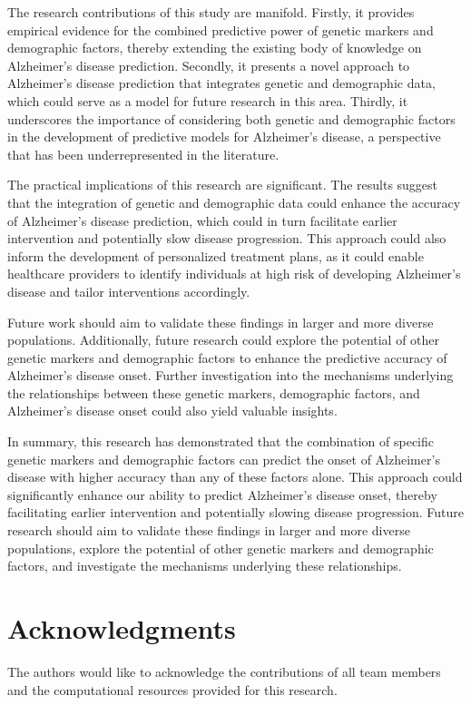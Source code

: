 \documentclass[conference]{IEEEtran}
\begin{document}
The research contributions of this study are manifold. Firstly, it provides empirical evidence for the combined predictive power of genetic markers and demographic factors, thereby extending the existing body of knowledge on Alzheimer's disease prediction. Secondly, it presents a novel approach to Alzheimer's disease prediction that integrates genetic and demographic data, which could serve as a model for future research in this area. Thirdly, it underscores the importance of considering both genetic and demographic factors in the development of predictive models for Alzheimer's disease, a perspective that has been underrepresented in the literature.

The practical implications of this research are significant. The results suggest that the integration of genetic and demographic data could enhance the accuracy of Alzheimer's disease prediction, which could in turn facilitate earlier intervention and potentially slow disease progression. This approach could also inform the development of personalized treatment plans, as it could enable healthcare providers to identify individuals at high risk of developing Alzheimer's disease and tailor interventions accordingly.

Future work should aim to validate these findings in larger and more diverse populations. Additionally, future research could explore the potential of other genetic markers and demographic factors to enhance the predictive accuracy of Alzheimer's disease onset. Further investigation into the mechanisms underlying the relationships between these genetic markers, demographic factors, and Alzheimer's disease onset could also yield valuable insights.

In summary, this research has demonstrated that the combination of specific genetic markers and demographic factors can predict the onset of Alzheimer's disease with higher accuracy than any of these factors alone. This approach could significantly enhance our ability to predict Alzheimer's disease onset, thereby facilitating earlier intervention and potentially slowing disease progression. Future research should aim to validate these findings in larger and more diverse populations, explore the potential of other genetic markers and demographic factors, and investigate the mechanisms underlying these relationships.

\section{Acknowledgments}
The authors would like to acknowledge the contributions of all team members and the computational resources provided for this research.
\end{document}
